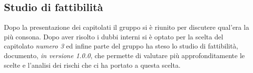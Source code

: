 \documentclass[12pt]{article}
\begin{document}
\subsection{Studio di fattibilità}
Dopo la presentazione dei capitolati il gruppo si è riunito per discutere qual'era la più consona. Dopo aver risolto i dubbi interni si è optato per la scelta del capitolato \textit{numero 3} ed infine parte del gruppo ha steso lo studio di fattibilità, documento, \textit{in versione 1.0.0}, che permette di valutare più approfonditamente le scelte e l'analisi dei rischi che ci ha portato a questa scelta.
\end{document}
